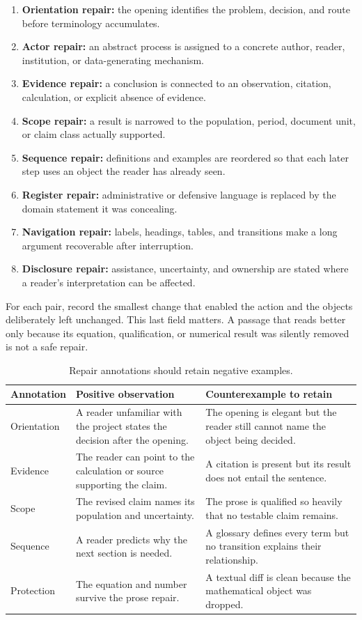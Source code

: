 \begin{enumerate}
\item \textbf{Orientation repair:} the opening identifies the problem,
      decision, and route before terminology accumulates.
\item \textbf{Actor repair:} an abstract process is assigned to a concrete
      author, reader, institution, or data-generating mechanism.
\item \textbf{Evidence repair:} a conclusion is connected to an observation,
      citation, calculation, or explicit absence of evidence.
\item \textbf{Scope repair:} a result is narrowed to the population, period,
      document unit, or claim class actually supported.
\item \textbf{Sequence repair:} definitions and examples are reordered so
      that each later step uses an object the reader has already seen.
\item \textbf{Register repair:} administrative or defensive language is
      replaced by the domain statement it was concealing.
\item \textbf{Navigation repair:} labels, headings, tables, and transitions
      make a long argument recoverable after interruption.
\item \textbf{Disclosure repair:} assistance, uncertainty, and ownership are
      stated where a reader's interpretation can be affected.
\end{enumerate}

For each pair, record the smallest change that enabled the action and the
objects deliberately left unchanged. This last field matters. A passage that
reads better only because its equation, qualification, or numerical result
was silently removed is not a safe repair.

\begin{table}[H]
\centering
\small
\begin{tabularx}{\textwidth}{@{}p{}p{}L@{}}
\toprule
Annotation & Positive observation & Counterexample to retain \\
\midrule
Orientation & A reader unfamiliar with the project states the decision after the opening. &
The opening is elegant but the reader still cannot name the object being
decided. \\
Evidence & The reader can point to the calculation or source supporting the
claim. & A citation is present but its result does not entail the sentence. \\
Scope & The revised claim names its population and uncertainty. & The prose is
qualified so heavily that no testable claim remains. \\
Sequence & A reader predicts why the next section is needed. & A glossary
defines every term but no transition explains their relationship. \\
Protection & The equation and number survive the prose repair. & A textual
diff is clean because the mathematical object was dropped. \\
\bottomrule
\end{tabularx}
\caption{Repair annotations should retain negative examples.}
\label{tab:repair-annotations}
\end{table}

